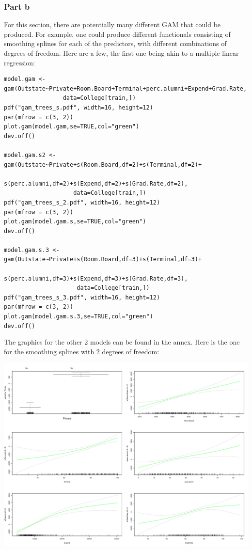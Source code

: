 \documentclass[11pt, a4paper]{article}
\begin{document}
\subsubsection{Part b}
\label{sec-1-1-2}

For this section, there are potentially many different GAM that could
be produced. For example, one could produce different functionals
consisting of smoothing splines for each of the predictors, with
different combinations of degrees of freedom. Here are a few, the
first one being akin to a multiple linear regression:


\begin{verbatim}
model.gam <- gam(Outstate~Private+Room.Board+Terminal+perc.alumni+Expend+Grad.Rate,
                 data=College[train,])
pdf("gam_trees_s.pdf", width=16, height=12)
par(mfrow = c(3, 2))
plot.gam(model.gam,se=TRUE,col="green")
dev.off()

model.gam.s2 <- gam(Outstate~Private+s(Room.Board,df=2)+s(Terminal,df=2)+
                    s(perc.alumni,df=2)+s(Expend,df=2)+s(Grad.Rate,df=2),
                    data=College[train,])
pdf("gam_trees_s_2.pdf", width=16, height=12)
par(mfrow = c(3, 2))
plot.gam(model.gam.s,se=TRUE,col="green")
dev.off()

model.gam.s.3 <- gam(Outstate~Private+s(Room.Board,df=3)+s(Terminal,df=3)+
                     s(perc.alumni,df=3)+s(Expend,df=3)+s(Grad.Rate,df=3),
                     data=College[train,])
pdf("gam_trees_s_3.pdf", width=16, height=12)
par(mfrow = c(3, 2))
plot.gam(model.gam.s.3,se=TRUE,col="green")
dev.off()
\end{verbatim}

The graphics for the other 2 models can be found in the annex. Here
is the one for the smoothing splines with 2 degrees of freedom: 

\includegraphics[scale=0.45]{gam_trees_s_2.pdf}
\end{document}
